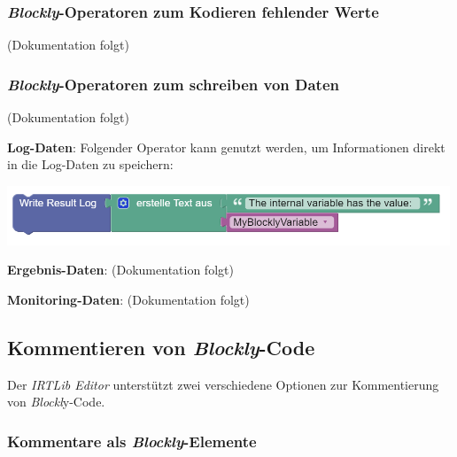 \documentclass[
  letterpaper,
  DIV=11]{scrreprt}
\begin{document}
\begin{tcolorbox}
{\subsubsection{\texorpdfstring{\emph{Blockly}-Operatoren zum Kodieren
fehlender
Werte}{Blockly-Operatoren zum Kodieren fehlender Werte}}\label{blockly-operatoren-zum-kodieren-fehlender-werte-1}}

(Dokumentation folgt)

\hypertarget{blockly-operatoren-zum-schreiben-von-daten-1}{%
\subsubsection{\texorpdfstring{\emph{Blockly}-Operatoren zum schreiben
von
Daten}{Blockly-Operatoren zum schreiben von Daten}}\label{blockly-operatoren-zum-schreiben-von-daten-1}}

(Dokumentation folgt)

\textbf{Log-Daten}: Folgender Operator kann genutzt werden, um
Informationen direkt in die Log-Daten zu speichern:

\includegraphics[width=5.20833in,height=\textheight]{img/screenshot-write-result-log-element-with-example-01-ENG.png}

\textbf{Ergebnis-Daten}: (Dokumentation folgt)

\textbf{Monitoring-Daten}: (Dokumentation folgt)

\hypertarget{kommentieren-von-blockly-code-1}{%
\subsection{\texorpdfstring{Kommentieren von
\emph{Blockly}-Code}{Kommentieren von Blockly-Code}}\label{kommentieren-von-blockly-code-1}}

Der \emph{IRTLib Editor} unterstützt zwei verschiedene Optionen zur
Kommentierung von \emph{Blockl}y-Code.

\hypertarget{kommentare-als-blockly-elemente-1}{%
\subsubsection{\texorpdfstring{Kommentare als
\emph{Blockly}-Elemente}{Kommentare als Blockly-Elemente}}\label{kommentare-als-blockly-elemente-1}}


\end{tcolorbox}
\end{document}
